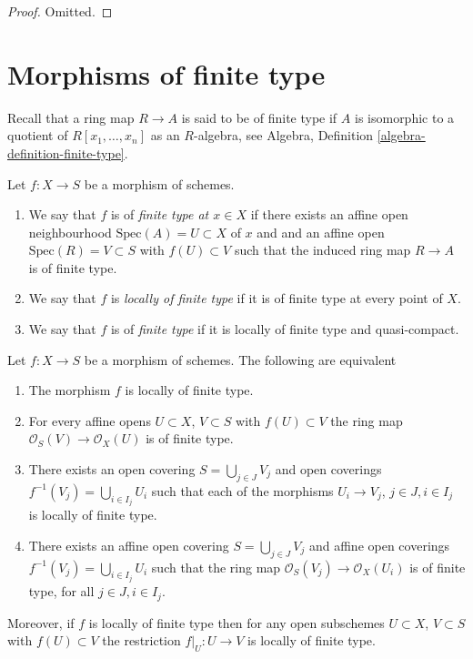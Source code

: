 \begin{proof}
Omitted.
\end{proof}








\section{Morphisms of finite type}
\label{section-finite-type}

\noindent
Recall that a ring map $R \to A$ is said to be of finite type if
$A$ is isomorphic to a quotient of $R[x_1, \ldots, x_n]$ as an $R$-algebra, see
Algebra, Definition \ref{algebra-definition-finite-type}.

\begin{definition}
\label{definition-finite-type}
Let $f : X \to S$ be a morphism of schemes.
\begin{enumerate}
\item We say that $f$ is of {\it finite type at $x \in X$} if
there exists an affine open neighbourhood $\text{Spec}(A) = U \subset X$
of $x$ and and an affine open $\text{Spec}(R) = V \subset S$
with $f(U) \subset V$ such that the induced ring map
$R \to A$ is of finite type.
\item We say that $f$ is {\it locally of finite type} if it is
of finite type at every point of $X$.
\item We say that $f$ is of {\it finite type} if it is locally of
finite type and quasi-compact.
\end{enumerate}
\end{definition}

\begin{lemma}
\label{lemma-locally-finite-type-characterize}
Let $f : X \to S$ be a morphism of schemes.
The following are equivalent
\begin{enumerate}
\item The morphism $f$ is locally of finite type.
\item For every affine opens $U \subset X$, $V \subset S$
with $f(U) \subset V$ the ring map
$\mathcal{O}_S(V) \to \mathcal{O}_X(U)$ is of finite type.
\item There exists an open covering $S = \bigcup_{j \in J} V_j$
and open coverings $f^{-1}(V_j) = \bigcup_{i \in I_j} U_i$ such
that each of the morphisms $U_i \to V_j$, $j\in J, i\in I_j$
is locally of finite type.
\item There exists an affine open covering $S = \bigcup_{j \in J} V_j$
and affine open coverings $f^{-1}(V_j) = \bigcup_{i \in I_j} U_i$ such
that the ring map $\mathcal{O}_S(V_j) \to \mathcal{O}_X(U_i)$ is
of finite type, for all $j\in J, i\in I_j$.
\end{enumerate}
Moreover, if $f$ is locally of finite type then for
any open subschemes $U \subset X$, $V \subset S$ with $f(U) \subset V$
the restriction $f|_U : U \to V$ is locally of finite type.
\end{lemma}

